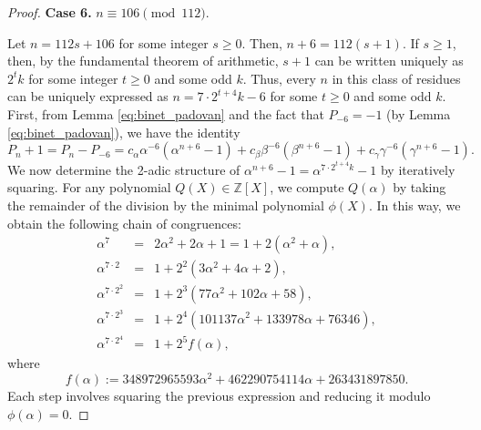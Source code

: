 \documentclass[10pt,a4paper]{amsart}
\begin{document}
\begin{proof}
	\medskip
	\noindent\textbf{Case 6.} $n\equiv 106\pmod{112}$.
	
Let $n=112s+106$ for some integer $s\ge 0$. Then, $n+6=112(s+1)$. If $s\ge 1$, then, by the fundamental theorem of arithmetic, $s+1$ can be written uniquely as $2^{t}k$ for some integer $t\ge 0$ and some odd $k$. Thus, every $n$ in this class of residues can be uniquely expressed as $n=7\cdot 2^{t+4}k-6$ for some $t\ge 0$ and some odd $k$. First, from Lemma \ref{eq:binet_padovan} and the fact that $P_{-6}=-1$ (by Lemma \ref{eq:binet_padovan}), we have the identity
	\begin{equation}\label{eq:key-case7}
		P_n+1 = P_n - P_{-6} 
		= c_{\alpha}\alpha^{-6}(\alpha^{n+6}-1)
		+c_{\beta}\beta^{-6}(\beta^{n+6}-1)
		+c_{\gamma}\gamma^{-6}(\gamma^{n+6}-1).
	\end{equation}
	We now determine the 2-adic structure of 
	$\alpha^{n+6}-1=\alpha^{7\cdot 2^{t+4}k}-1$ 
	by iteratively squaring. For any polynomial 
	$Q(X)\in\mathbb{Z}[X]$, we compute $Q(\alpha)$ 
	by taking the remainder of the division by the 
	minimal polynomial $\phi(X)$. In this way, 
	we obtain the following chain of congruences:
	\begin{eqnarray}
	\label{eq:alpha}
		\alpha^7 
		&=& 2\alpha^2+2\alpha+1
		= 1+2(\alpha^{2}+\alpha),\nonumber\\
		\alpha^{7\cdot 2} 
		&=& 1+2^2(3\alpha^2+4\alpha+2),\\
		\alpha^{7\cdot 2^2} 
		&=& 1+2^3(77\alpha^2+102\alpha+58),\nonumber\\
		\alpha^{7\cdot 2^3} 
		&=& 1+2^4(101137\alpha^2+133978\alpha+76346),\nonumber\\
		\alpha^{7\cdot 2^4} 
		&=& 1+2^5 f(\alpha),\nonumber
	\end{eqnarray}
	where
	\begin{equation*}
		f(\alpha) := 348972965593\alpha^2
		+462290754114\alpha+263431897850.
	\end{equation*}
	Each step involves squaring the previous expression 
	and reducing it modulo $\phi(\alpha)=0$.
	

\end{proof}
\end{document}
